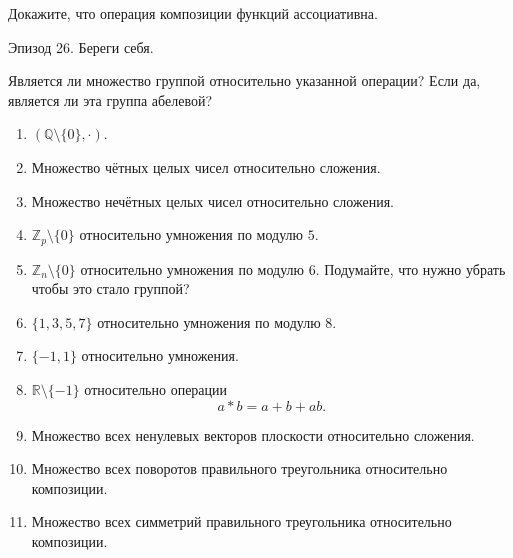  Докажите, что операция композиции функций ассоциативна.


\newpage


\begin{flushright}
        \scriptsize{Эпизод 26. Береги себя.}
\end{flushright}

Является ли множество группой относительно указанной операции? Если да, является ли эта группа абелевой?

\begin{enumerate}

    \item \((\mathbb Q\setminus\{0\},\cdot)\).

    \item Множество чётных целых чисел относительно сложения.

    \item Множество нечётных целых чисел относительно сложения.

    \item \(\mathbb Z_p\setminus\{0\}\) относительно умножения по модулю \(5\).

    \item \(\mathbb Z_n\setminus\{0\}\) относительно умножения по модулю \(6\). Подумайте, что нужно убрать чтобы это стало группой?

    \item \(\{1,3,5,7\}\) относительно умножения по модулю \(8\).

    \item \(\{-1,1\}\) относительно умножения.


    \item \(\mathbb R\setminus\{-1\}\) относительно операции
    \[
    a*b=a+b+ab.
    \]

    \item Множество всех ненулевых векторов плоскости относительно сложения.

    \item Множество всех поворотов правильного треугольника относительно композиции.

    \item Множество всех симметрий правильного треугольника относительно композиции.
\end{enumerate}


